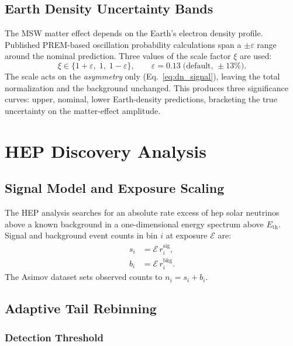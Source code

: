 \documentclass[12pt,a4paper]{article}
\begin{document}
\subsection{Earth Density Uncertainty Bands}
\label{sec:dn_band}

The MSW matter effect depends on the Earth's electron density profile.
Published PREM-based oscillation probability calculations span a
$\pm\varepsilon$ range around the nominal prediction.
Three values of the scale factor $\xi$ are used:
\begin{equation}
  \xi \in \{1+\varepsilon,\;1,\;1-\varepsilon\},
  \qquad
  \varepsilon = 0.13\;\text{(default, }\pm 13\%\text{)}.
  \label{eq:dn_band}
\end{equation}
The scale acts on the \emph{asymmetry} only (Eq.~\eqref{eq:dn_signal}),
leaving the total normalization and the background unchanged.
This produces three significance curves: upper, nominal, lower Earth-density
predictions, bracketing the true uncertainty on the matter-effect amplitude.

\section{HEP Discovery Analysis}
\label{sec:hep}

\subsection{Signal Model and Exposure Scaling}
\label{sec:hep_signal}

The HEP analysis searches for an absolute rate excess of hep solar neutrinos
above a known background in a one-dimensional energy spectrum above $E_{\mathrm{th}}$.
Signal and background event counts in bin $i$ at exposure $\mathcal{E}$ are:
\begin{align}
  s_i &= \mathcal{E}\, r_i^{\mathrm{sig}},
  \label{eq:hep_signal}\\
  b_i &= \mathcal{E}\, r_i^{\mathrm{bkg}}.
  \label{eq:hep_background}
\end{align}
The Asimov dataset sets observed counts to $n_i = s_i + b_i$.

\subsection{Adaptive Tail Rebinning}
\label{sec:rebin}

\subsubsection{Detection Threshold}
\label{sec:detection_threshold}
\end{document}
